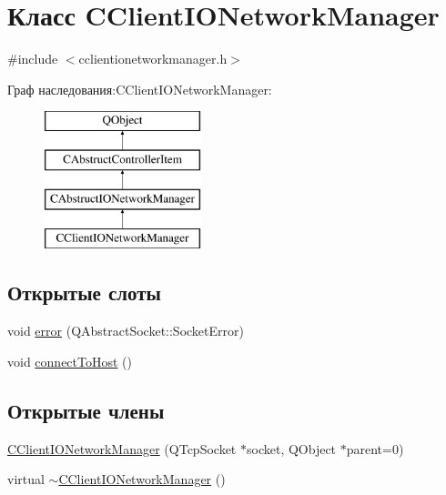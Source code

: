 \hypertarget{class_c_client_i_o_network_manager}{}\section{Класс C\+Client\+I\+O\+Network\+Manager}
\label{class_c_client_i_o_network_manager}


{\ttfamily \#include $<$cclientionetworkmanager.\+h$>$}

Граф наследования\+:C\+Client\+I\+O\+Network\+Manager\+:\begin{figure}[H]
\begin{center}
\leavevmode
\includegraphics[height=4.000000cm]{class_c_client_i_o_network_manager}
\end{center}
\end{figure}
\subsection*{Открытые слоты}
\begin{DoxyCompactItemize}
\item 
void \hyperlink{class_c_client_i_o_network_manager_a1a4c3fd9405b85cb43e20b24d9db18e8}{error} (Q\+Abstract\+Socket\+::\+Socket\+Error)
\item 
void \hyperlink{class_c_client_i_o_network_manager_aaa7b77037603697d3bee7daed467b092}{connect\+To\+Host} ()
\end{DoxyCompactItemize}
\subsection*{Открытые члены}
\begin{DoxyCompactItemize}
\item 
\hyperlink{class_c_client_i_o_network_manager_af9f85db2c4a515cc974038086edc6b9f}{C\+Client\+I\+O\+Network\+Manager} (Q\+Tcp\+Socket $\ast$socket, Q\+Object $\ast$parent=0)
\item 
virtual \hyperlink{class_c_client_i_o_network_manager_aaaeddd1337640480b4eae0418cee6026}{$\sim$\+C\+Client\+I\+O\+Network\+Manager} ()
\end{DoxyCompactItemize}
